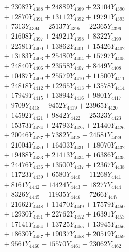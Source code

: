 \documentclass[a4paper,10pt]{article}
\begin{document}
{\begin{align}
&\;  + 23082 Y_{4388} + 24889 Y_{4389} + 23104 Y_{4390} \\[0.3ex]
&\;  + 12870 Y_{4391} + 13112 Y_{4392} + 19791 Y_{4393} \\[0.3ex]
&\;  + 7313 Y_{4394} + 25137 Y_{4395} + 22365 Y_{4396} \\[0.3ex]
&\;  + 21608 Y_{4397} + 24921 Y_{4398} + 8322 Y_{4399} \\[0.3ex]
&\;  + 22581 Y_{4400} + 13862 Y_{4401} + 15426 Y_{4402} \\[0.3ex]
&\;  + 13183 Y_{4403} + 25480 Y_{4404} + 15797 Y_{4405} \\[0.3ex]
&\;  + 24840 Y_{4406} + 23558 Y_{4407} + 8449 Y_{4408} \\[0.5ex]\allowbreak
&\;  + 10487 Y_{4409} + 25579 Y_{4410} + 11500 Y_{4411} \\[0.3ex]
&\;  + 24818 Y_{4412} + 12265 Y_{4413} + 13578 Y_{4414} \\[0.3ex]
&\;  + 17949 Y_{4415} + 13894 Y_{4416} + 9801 Y_{4417} \\[0.3ex]
&\;  + 9709 Y_{4418} + 9452 Y_{4419} + 23965 Y_{4420} \\[0.3ex]
&\;  + 14592 Y_{4421} + 9842 Y_{4422} + 25323 Y_{4423} \\[0.3ex]
&\;  + 15373 Y_{4424} + 24793 Y_{4425} + 21440 Y_{4426} \\[0.3ex]
&\;  + 20046 Y_{4427} + 7382 Y_{4428} + 24581 Y_{4429} \\[0.3ex]
&\;  + 21004 Y_{4430} + 16403 Y_{4431} + 18070 Y_{4432} \\[0.3ex]
&\;  + 19488 Y_{4433} + 21413 Y_{4434} + 16386 Y_{4435} \\[0.3ex]
&\;  + 24476 Y_{4436} + 13500 Y_{4437} + 12367 Y_{4438} \\[0.5ex]\allowbreak
&\;  + 11723 Y_{4439} + 6580 Y_{4440} + 11268 Y_{4441} \\[0.3ex]
&\;  + 8161 Y_{4442} + 14424 Y_{4443} + 18277 Y_{4444} \\[0.3ex]
&\;  + 8326 Y_{4445} + 11935 Y_{4446} + 7266 Y_{4447} \\[0.3ex]
&\;  + 21662 Y_{4448} + 11470 Y_{4449} + 17579 Y_{4450} \\[0.3ex]
&\;  + 12930 Y_{4451} + 22762 Y_{4452} + 16391 Y_{4453} \\[0.3ex]
&\;  + 17141 Y_{4454} + 13725 Y_{4455} + 13945 Y_{4456} \\[0.3ex]
&\;  + 18630 Y_{4457} + 19037 Y_{4458} + 20519 Y_{4459} \\[0.3ex]
&\;  + 9561 Y_{4460} + 15570 Y_{4461} + 23062 Y_{4462} \\[0.3ex]

\end{align}}
\end{document}
